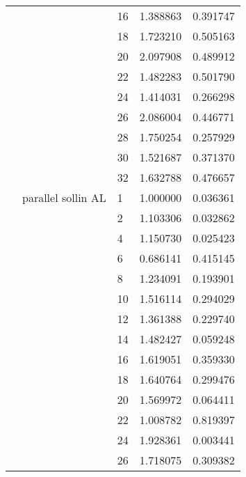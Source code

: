 \begin{tabular}{lllrr}
                      &                     & 16 &  1.388863 &  0.391747 \\
                      &                     & 18 &  1.723210 &  0.505163 \\
                      &                     & 20 &  2.097908 &  0.489912 \\
                      &                     & 22 &  1.482283 &  0.501790 \\
                      &                     & 24 &  1.414031 &  0.266298 \\
                      &                     & 26 &  2.086004 &  0.446771 \\
                      &                     & 28 &  1.750254 &  0.257929 \\
                      &                     & 30 &  1.521687 &  0.371370 \\
                      &                     & 32 &  1.632788 &  0.476657 \\
                      & parallel sollin AL & 1  &  1.000000 &  0.036361 \\
                      &                     & 2  &  1.103306 &  0.032862 \\
                      &                     & 4  &  1.150730 &  0.025423 \\
                      &                     & 6  &  0.686141 &  0.415145 \\
                      &                     & 8  &  1.234091 &  0.193901 \\
                      &                     & 10 &  1.516114 &  0.294029 \\
                      &                     & 12 &  1.361388 &  0.229740 \\
                      &                     & 14 &  1.482427 &  0.059248 \\
                      &                     & 16 &  1.619051 &  0.359330 \\
                      &                     & 18 &  1.640764 &  0.299476 \\
                      &                     & 20 &  1.569972 &  0.064411 \\
                      &                     & 22 &  1.008782 &  0.819397 \\
                      &                     & 24 &  1.928361 &  0.003441 \\
                      &                     & 26 &  1.718075 &  0.309382 \\

\end{tabular}
